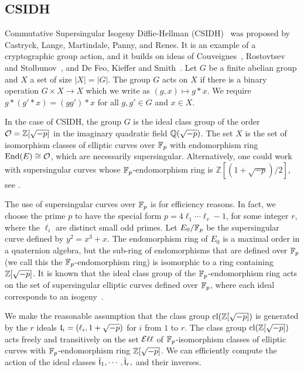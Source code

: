 
\subsection{CSIDH\label{sec:CSIDH}}


Commutative Supersingular Isogeny Diffie-Hellman (CSIDH)~\cite{CSIDH} was proposed by Castryck, Lange, Martindale, Panny, and Renes. It is an example of a cryptographic group action, and it builds on ideas of Couveignes~\cite{Couv06}, Rostovtsev and Stolbunov~\cite{RosSto}, and  De Feo, Kieffer and Smith~\cite{DFKS18}.
Let $G$ be a finite abelian group and $X$ a set of size $|X|=|G|$. The group $G$ acts on $X$ if there is a binary operation $G \times X \to X$ which we write as $(g,x) \mapsto g*x$. We require $g*( g'*x) = (gg')*x$ for all $g, g' \in G$ and $x \in X$.

In the case of CSIDH, the group $G$ is the ideal class group of the order $\mathcal{O} = \mathbb{Z}[\sqrt{-p}]$ in the imaginary quadratic field $\mathbb{Q}( \sqrt{-p} )$.
The set $X$ is the set of isomorphism classes of elliptic curves over $\mathbb{F}_p$ with endomorphism ring $\text{End}(E) \cong \mathcal{O}$, which are necessarily supersingular.
Alternatively, one could work with supersingular curves whose $\mathbb{F}_p$-endomorphism ring is $\mathbb{Z}[(1+\sqrt{-p})/2]$, see \cite{CD20}.


The use of supersingular curves over $\mathbb{F}_p$ is for efficiency reasons.
In fact, we choose the prime $p$ to have the special form $p = 4\ell_1 \cdots \ell_r -1$, for some integer $r$, where the $\ell_i$ are distinct small odd primes.
Let $E_0/\mathbb{F}_p$ be the supersingular curve defined by $y^2 = x^3 + x$. 
The endomorphism ring of $E_0$ is a maximal order in a quaternion algebra, but the sub-ring of endomorphisms that are defined over $\mathbb{F}_p$ (we call this the $\mathbb{F}_p$-endomorphism ring) is isomorphic to a ring containing $\mathbb{Z}[\sqrt{-p}]$. 
It is known that the ideal class group of the $\mathbb{F}_p$-endomorphism ring acts on the set of supersingular elliptic curves defined over $\mathbb{F}_p$, where each ideal corresponds to an isogeny~\cite{Waterhouse}.

We make the reasonable assumption that the class group $\text{cl}(\mathbb{Z}[\sqrt{-p}])$ is generated by the $r$ ideals $\mathfrak{l}_i = (\ell_i, 1 + \sqrt{-p} )$ for $i$ from $1$ to $r$.
The class group $\text{cl}(\mathbb{Z}[\sqrt{-p}])$ acts freely and transitively on the set $\mathcal{E}\ell\ell$ of $\mathbb{F}_p$-isomorphism classes of elliptic curves with $\mathbb{F}_p$-endomorphism ring $\mathbb{Z}[\sqrt{-p}]$. We can efficiently compute the action of the ideal classes $\overline{\mathfrak{l}}_1,\cdots,\overline{\mathfrak{l}}_r,$ and their inverses.

